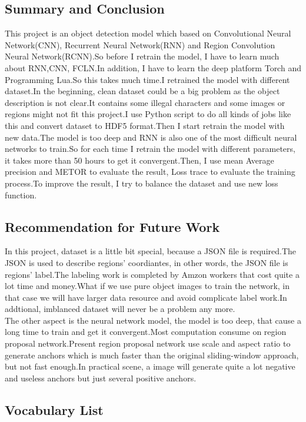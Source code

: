 \documentclass[12pt,a4paper]{report}
\begin{document}
\section{Summary and Conclusion}
This project is an object detection model which based on Convolutional Neural Network(CNN), Recurrent Neural Network(RNN) and Region Convolution Neural Network(RCNN).So before I retrain the model, I have to learn much about RNN,CNN, FCLN.In addition, I have to learn the deep platform Torch and Programming Lua.So this takes much time.I retrained the model with different dataset.In the beginning, clean dataset could be a big problem as the object description is not clear.It contains some illegal characters and some images or regions might not fit this project.I use Python script to do all kinds of jobs like this and convert dataset to HDF5 format.Then I start retrain the model with new data.The model is too deep and RNN is also one of the most difficult neural networks to train.So for each time I retrain the model with different parameters, it takes more than 50 hours to get it convergent.Then, I use mean Average precision and METOR to evaluate the result, Loss trace to evaluate the training process.To improve the result, I try to balance the dataset and use new loss function.
\newpage
\section{Recommendation for Future Work}
In this project, dataset is a little bit special, because a JSON file is required.The JSON is used to describe regions' coordiantes, in other words, the JSON file is regions' label.The labeling work is completed by Amzon workers that cost quite a lot time and money.What if we use pure object images to train the network, in that case we will have larger data resource and avoid complicate label work.In addtional, imblanced dataset will never be a problem any more.\\
The other aspect is the neural network model, the model is too deep,  that cause a long time to train and get it convergent.Most computation consume on region proposal network.Present region proposal network use scale
and aspect ratio to generate anchors which is much faster than the original sliding-window approach, but not fast enough.In practical scene, a image will generate quite a lot negative and useless anchors but just several positive anchors.\cite{focalloss}

\newpage


\printbibliography

\newpage
\begin{appendices}
\chapter{Vocabulary List}

%
\end{appendices}
\end{document}
